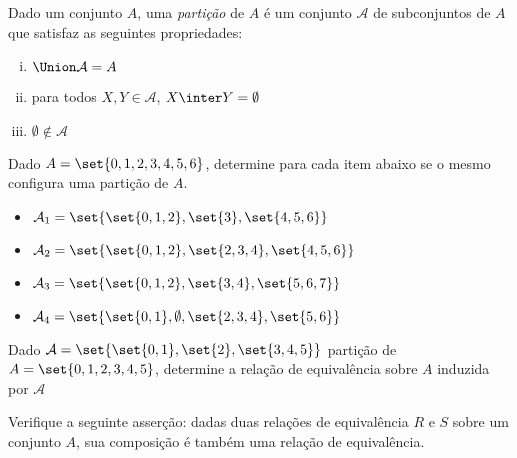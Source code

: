\begin{definition}[Partição]
Dado um conjunto $A$, uma \emph{partição} de $A$ é um conjunto $\mathcal{A}$ de subconjuntos de $A$ que satisfaz as seguintes propriedades:
\begin{enumerate}[(i)]
  \item $\Union \mathcal{A} = A$
  \item para todos $X,Y \in \mathcal{A}$, $X \inter Y = \emptyset$
  \item $\emptyset \not\in \mathcal{A}$
\end{enumerate}
\end{definition}

\begin{exercise}
Dado $A = \set{0,1,2,3,4,5,6}$, determine para cada item abaixo se o mesmo configura uma partição de $A$.

\begin{itemize}
  \item $\mathcal{A}_1 = \set{\set{0,1,2},\set{3},\set{4,5,6}}$
  \item $\mathcal{A}_2 = \set{\set{0,1,2},\set{2,3,4},\set{4,5,6}}$
  \item $\mathcal{A}_3 = \set{\set{0,1,2},\set{3,4},\set{5,6,7}}$
  \item $\mathcal{A}_4 = \set{\set{0,1},\emptyset,\set{2,3,4},\set{5,6}}$
\end{itemize}
\end{exercise}

\begin{exercise}
Dado $\mathcal{A} = \set{\set{0,1},\set{2},\set{3,4,5}}$ partição de $A = \set{0,1,2,3,4,5}$, determine a relação de equivalência sobre $A$ induzida por $\mathcal{A}$
\end{exercise}


\begin{exercise}
Verifique a seguinte asserção: dadas duas relações de equivalência $R$ e $S$ sobre um conjunto $A$, sua composição é também uma relação de equivalência.
\end{exercise}
